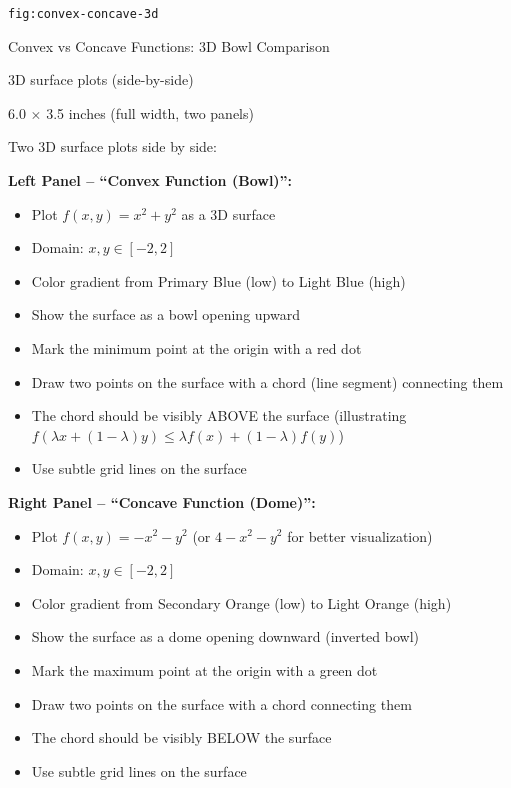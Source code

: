 \documentclass[12pt]{article}
\begin{document}
\begin{description}[style=nextline, leftmargin=0pt]
    \item[Figure ID] \texttt{fig:convex-concave-3d}
    \item[Title] Convex vs Concave Functions: 3D Bowl Comparison
    \item[Type] 3D surface plots (side-by-side)
    \item[Size] 6.0 $\times$ 3.5 inches (full width, two panels)

    \item[Visual Description]
    Two 3D surface plots side by side:

    \textbf{Left Panel -- ``Convex Function (Bowl)'':}
    \begin{itemize}
        \item Plot $f(x, y) = x^2 + y^2$ as a 3D surface
        \item Domain: $x, y \in [-2, 2]$
        \item Color gradient from Primary Blue (low) to Light Blue (high)
        \item Show the surface as a bowl opening upward
        \item Mark the minimum point at the origin with a red dot
        \item Draw two points on the surface with a chord (line segment) connecting them
        \item The chord should be visibly ABOVE the surface (illustrating $f(\lambda x + (1-\lambda)y) \leq \lambda f(x) + (1-\lambda)f(y)$)
        \item Use subtle grid lines on the surface
    \end{itemize}

    \textbf{Right Panel -- ``Concave Function (Dome)'':}
    \begin{itemize}
        \item Plot $f(x, y) = -x^2 - y^2$ (or $4 - x^2 - y^2$ for better visualization)
        \item Domain: $x, y \in [-2, 2]$
        \item Color gradient from Secondary Orange (low) to Light Orange (high)
        \item Show the surface as a dome opening downward (inverted bowl)
        \item Mark the maximum point at the origin with a green dot
        \item Draw two points on the surface with a chord connecting them
        \item The chord should be visibly BELOW the surface
        \item Use subtle grid lines on the surface
    \end{itemize}


\end{description}
\end{document}
